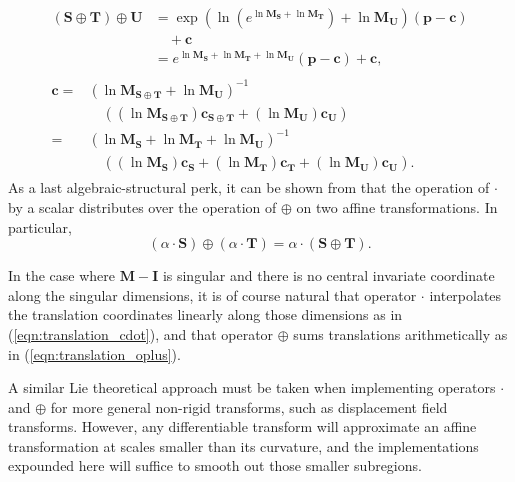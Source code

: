         \begin{gather}
          \begin{split}
            (\mathbf{S} \oplus \mathbf{T}) \oplus \mathbf{U} &= \exp(\ln(e^{\ln\mathbf{M_S} + \ln\mathbf{M_T}}) + \ln\mathbf{M_U})(\mathbf{p} - \mathbf{c}) \\
                                                             &\quad + \mathbf{c} \\
                                                             &= e^{\ln\mathbf{M_S} + \ln\mathbf{M_T} + \ln\mathbf{M_U}}(\mathbf{p} - \mathbf{c}) + \mathbf{c},
          \end{split} \\
          \begin{split}
            \mathbf{c} =& (\ln\mathbf{M_{S \oplus T}} + \ln\mathbf{M_U})^{-1} \\
                       &\quad ((\ln\mathbf{M_{S \oplus T}})\mathbf{c_{S \oplus T}} + (\ln\mathbf{M_U})\mathbf{c_U}) \\
                       =& (\ln\mathbf{M_S} + \ln\mathbf{M_T} + \ln\mathbf{M_U})^{-1} \\
                       &\quad ((\ln\mathbf{M_S})\mathbf{c_S} + (\ln\mathbf{M_T})\mathbf{c_T} + (\ln\mathbf{M_U})\mathbf{c_U}).
          \end{split}
        \end{gather}
        As a last algebraic-structural perk, it can be shown from  that the operation of $\cdot$ by a scalar distributes over the operation of $\oplus$ on two affine transformations. In particular,
        \begin{equation}
          (\alpha \cdot \mathbf{S}) \oplus (\alpha \cdot \mathbf{T}) = \alpha \cdot (\mathbf{S} \oplus \mathbf{T}).
        \end{equation}
        
        In the case where $\mathbf{M} - \mathbf{I}$ is singular and there is no central invariate coordinate along the singular dimensions, it is of course natural that operator $\cdot$ interpolates the translation coordinates linearly along those dimensions as in (\ref{eqn:translation_cdot}), and that operator $\oplus$ sums translations arithmetically as in (\ref{eqn:translation_oplus}).
        
        A similar Lie theoretical approach must be taken when implementing operators $\cdot$ and $\oplus$ for more general non-rigid transforms, such as displacement field transforms. However, any differentiable transform will approximate an affine transformation at scales smaller than its curvature, and the implementations expounded here will suffice to smooth out those smaller subregions.
	
